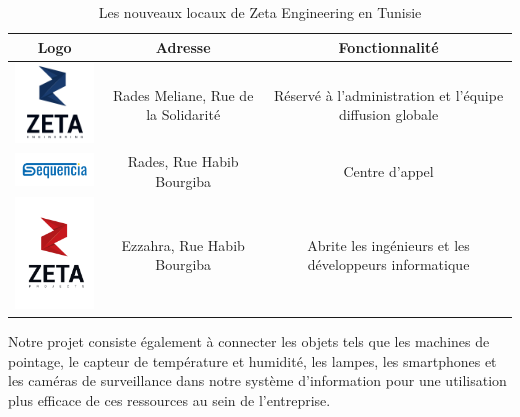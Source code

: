 \begin{table}[H]
\begin{center}
     \begin{tabular}{|c{5cm}|c{5cm}|c{5cm}|}
    \hline
	\textbf{Logo}         & \textbf{Adresse}   & \textbf{Fonctionnalité} \\
    \hline
    
	\includegraphics[width=3cm]{Images/logo-zeta1.png} & Rades Meliane, Rue de la Solidarité  & Réservé à l'administration et l'équipe diffusion globale  \\
	
 	\hline
 	
	\includegraphics[width=3cm]{Images/logo-Sequencia.png}   &  Rades, Rue Habib Bourgiba  &  Centre d'appel \\
	
	\hline
	
	\includegraphics[width=3cm]{Images/Logo-ZetaProject.png}  & Ezzahra, Rue Habib Bourgiba    & Abrite les ingénieurs et les développeurs informatique  \\
	
	\hline
	
     \end{tabular}
     \caption{Les nouveaux locaux de Zeta Engineering en Tunisie}
     \label{1}
     \end{center}
     \label{tab1}
\end{table}

Notre projet consiste également à connecter les objets tels que les machines de pointage, le capteur de température et humidité, les lampes, les smartphones et les caméras de surveillance dans notre système d'information pour une utilisation plus efficace de ces ressources au sein de l'entreprise.

